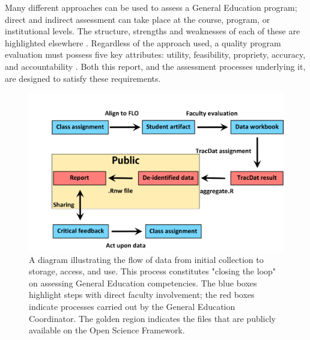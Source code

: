 \documentclass[fleqn,10pt]{SelfArx}\usepackage[]{graphicx}\usepackage[]{color}
\begin{document}
Many different approaches can be used to assess a General Education program; direct and indirect assessment can take place at the course, program, or institutional levels. The structure, strengths and weaknesses of each of these are highlighted elsewhere \citep{Allen2006a}. Regardless of the approach used, a quality program evaluation must possess five key attributes: utility, feasibility, propriety, accuracy, and accountability \citep{Yarbrough2011}. Both this report, and the assessment processes underlying it, are designed to satisfy these requirements.

\begin{figure}[htb]\centering %
\includegraphics[width=\textwidth]{./art/process}
\protect\caption{A diagram illustrating the flow of data from initial collection to storage, access, and use. This process constitutes "closing the loop" on assessing General Education competencies. The blue boxes highlight steps with direct faculty involvement; the red boxes indicate processes carried out by the General Education Coordinator. The golden region indicates the files that are publicly available on the Open Science Framework.}
\label{fig:process}
\end{figure}
\end{document}
